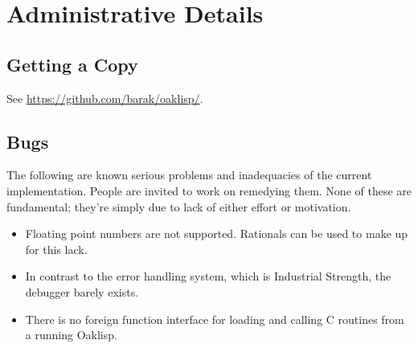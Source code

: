 %
%
%


\chapter{Administrative Details}

\section{Getting a Copy}

See \url{https://github.com/barak/oaklisp/}.

\section{Bugs}

The following are known serious problems and inadequacies of the
current implementation.  People are invited to work on remedying them.
None of these are fundamental; they're simply due to lack of either
effort or motivation.

\begin{itemize}
\item Floating point numbers are not supported.  Rationals can be
used to make up for this lack.

\item In contrast to the error handling system, which is Industrial
Strength, the debugger barely exists.

\item There is no foreign function interface for loading and calling
C routines from a running Oaklisp.

%
\end{itemize}


